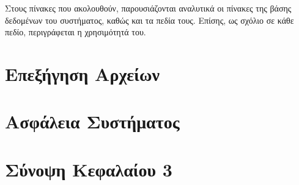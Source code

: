 Στους πίνακες που ακολουθούν, παρουσιάζονται αναλυτικά οι πίνακες της βάσης δεδομένων του συστήματος, καθώς και τα πεδία τους. Επίσης, ως σχόλιο σε κάθε πεδίο, περιγράφεται η χρησιμότητά του.

\FloatBarrier

\FloatBarrier

\section{Επεξήγηση Αρχείων}

\section{Ασφάλεια Συστήματος}

\section{Σύνοψη Κεφαλαίου 3}
